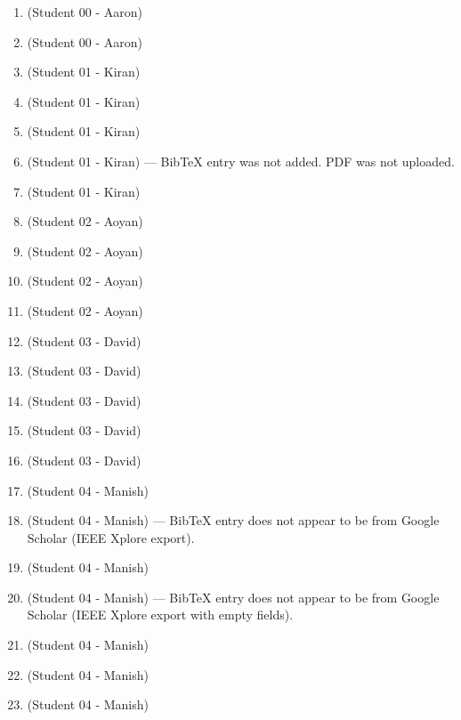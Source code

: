 \begin{enumerate}[label=\#\arabic*]
\item \cite{fan85debruijn} (Student 00 - Aaron)
\item \cite{shiu1997decoding} (Student 00 - Aaron)
\item \cite{gordon1966existence} (Student 01 - Kiran)
\item \cite{nomura1972theory} (Student 01 - Kiran)
\item \cite{ma1984note} (Student 01 - Kiran)
\item \cite{etzion1984construction} (Student 01 - Kiran) --- BibTeX entry was not added. PDF was not uploaded.
\item \cite{etzion2024pseduo} (Student 01 - Kiran)
\item \cite{chung1992universal} (Student 02 - Aoyan)
\item \cite{chee2025hierarchy} (Student 02 - Aoyan)
\item \cite{miyashita2022high} (Student 02 - Aoyan)
\item \cite{ivanyi2011perfect} (Student 02 - Aoyan)
\item \cite{mitchell1994decoding} (Student 03 - David)
\item \cite{reed1962note} (Student 03 - David)
\item \cite{macwilliams1976pseudo} (Student 03 - David)
\item \cite{ivanyi1987d} (Student 03 - David)
\item \cite{bossard2022topological} (Student 03 - David)
\item \cite{tesler2026phased} (Student 04 - Manish)
\item \cite{petriu1993two} (Student 04 - Manish) --- BibTeX entry does not appear to be from Google Scholar (IEEE Xplore export).
\item \cite{lavoie20043d} (Student 04 - Manish)
\item \cite{desjardins2007dense} (Student 04 - Manish) --- BibTeX entry does not appear to be from Google Scholar (IEEE Xplore export with empty fields).
\item \cite{geng2011structured} (Student 04 - Manish)
\item \cite{bardell1986pseudorandom} (Student 04 - Manish)
\item \cite{petriu1993environment} (Student 04 - Manish)

\end{enumerate}
